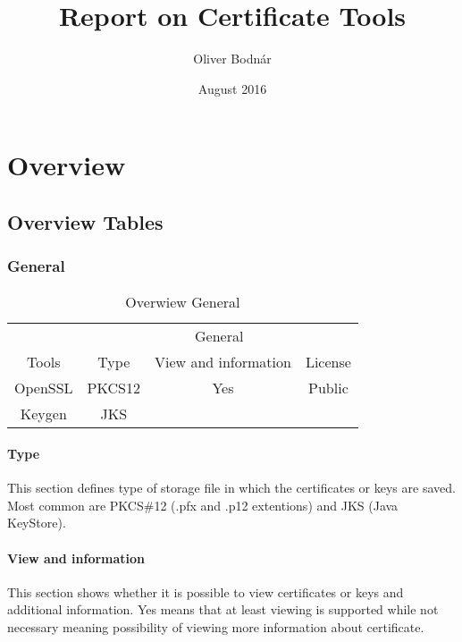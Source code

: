 \documentclass[10pt, a4paper]{report}
\title{Report on Certificate Tools}
\author{Oliver Bodnár}
\date{August 2016}
\begin{document}
\maketitle

\tableofcontents

\newpage

\part{Overview}

\chapter{Overview Tables}

\section{General}
\begin{table}[h!]
\centering
\caption{Overwiew General}
\label{my-label}
\begin{adjustbox}{max width=\textwidth}
\begin{tabular}{|c|c|c|c|}
\hline
                        & \multicolumn{3}{c|}{General}                   \\ \cline{2-4} 
\multirow{-2}{*}{Tools} & Type   & View and information        & License \\ \hline
OpenSSL                 & PKCS12 & \cellcolor[HTML]{34FF34}Yes & Public  \\ \hline
Keygen                  & JKS    &                             &         \\ \hline
\end{tabular}
\end{adjustbox}
\end{table}

\subsection{Type}
This section defines type of storage file in which the certificates or keys are saved. Most common are PKCS\#12 (.pfx and .p12 extentions) and JKS (Java KeyStore). 

\subsection{View and information}
This section shows whether it is possible to view certificates or keys and additional information. Yes means that at least viewing is supported while not necessary meaning possibility of viewing more information about certificate.
\end{document}
